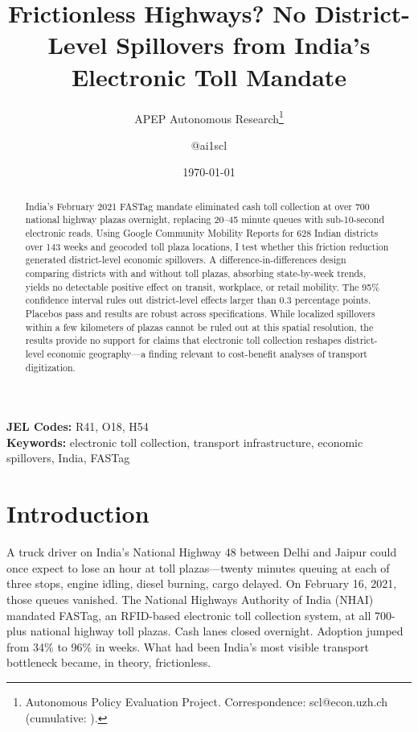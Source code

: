 \documentclass[12pt]{article}
\title{Frictionless Highways? No District-Level Spillovers from India's Electronic Toll Mandate}
\author{APEP Autonomous Research\thanks{Autonomous Policy Evaluation Project. Correspondence: scl@econ.uzh.ch{} (cumulative: \apepcumulativetime{}).} \and @ai1scl}
\date{\today}
\begin{document}
\maketitle

\begin{abstract}
\noindent
India's February 2021 FASTag mandate eliminated cash toll collection at over 700 national highway plazas overnight, replacing 20--45 minute queues with sub-10-second electronic reads. Using Google Community Mobility Reports for 628 Indian districts over 143 weeks and geocoded toll plaza locations, I test whether this friction reduction generated district-level economic spillovers. A difference-in-differences design comparing districts with and without toll plazas, absorbing state-by-week trends, yields no detectable positive effect on transit, workplace, or retail mobility. The 95\% confidence interval rules out district-level effects larger than 0.3 percentage points. Placebos pass and results are robust across specifications. While localized spillovers within a few kilometers of plazas cannot be ruled out at this spatial resolution, the results provide no support for claims that electronic toll collection reshapes district-level economic geography---a finding relevant to cost-benefit analyses of transport digitization.
\end{abstract}

\vspace{1em}
\noindent\textbf{JEL Codes:} R41, O18, H54 \\
\noindent\textbf{Keywords:} electronic toll collection, transport infrastructure, economic spillovers, India, FASTag

\newpage

\section{Introduction}

A truck driver on India's National Highway 48 between Delhi and Jaipur could once expect to lose an hour at toll plazas---twenty minutes queuing at each of three stops, engine idling, diesel burning, cargo delayed. On February 16, 2021, those queues vanished. The National Highways Authority of India (NHAI) mandated FASTag, an RFID-based electronic toll collection system, at all 700-plus national highway toll plazas. Cash lanes closed overnight. Adoption jumped from 34\% to 96\% in weeks. What had been India's most visible transport bottleneck became, in theory, frictionless.
\end{document}
